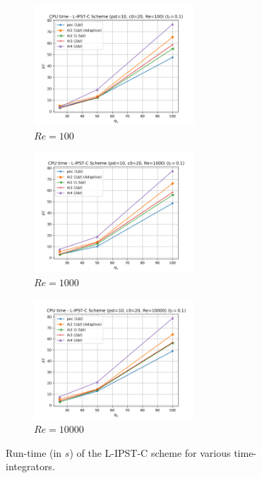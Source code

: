 \begin{figure}[htbp!]
  \begin{subfigure}{7cm}
    \centering\includegraphics[width=6cm]{Code-Figures/lipstc/integrator/pois_rt_pst_10_c0_20_re_100.png}
    \caption{$Re = 100$}
  \end{subfigure}
  \begin{subfigure}{7cm}
    \centering\includegraphics[width=6cm]{Code-Figures/lipstc/integrator/pois_rt_pst_10_c0_20_re_1000.png}
    \caption{$Re = 1000$}
  \end{subfigure}
  \begin{subfigure}{7cm}
    \centering\includegraphics[width=6cm]{Code-Figures/lipstc/integrator/pois_rt_pst_10_c0_20_re_10000.png}
    \caption{$Re = 10000$}
  \end{subfigure}
  \caption{Run-time (in $s$) of the L-IPST-C scheme for various time-integrators.}
  \label{fig:lipstc-integrator-rt}
\end{figure}


